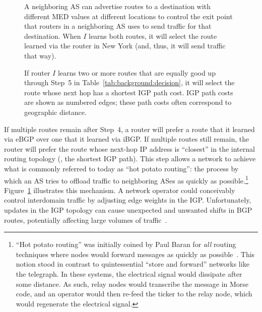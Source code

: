\begin{figure}
\begin{minipage}{0.48\linewidth}
\centering{}
\caption[The use of the MED attribute to control inbound traffic]{A
neighboring AS can advertise routes to a destination with 
different MED values at different locations to control the exit point
that routers in a neighboring AS uses to send traffic for that
destination.  When $I$ learns both routes, it will select the route
learned via the router in New York (and, thus, it will send traffic that
way).}
\label{fig:rw_med}
\end{minipage}
\hfill
\begin{minipage}{0.48\linewidth}
\centering{}
\caption[How the IGP implements ``hot potato'' routing]{If router $I$ learns two or more routes that are equally good
up through Step~5 in Table~\ref{tab:background:decision}, it will select the route
whose next hop has a shortest IGP path cost.  IGP path costs are shown as
numbered edges; these path costs often correspond to geographic distance.}
\label{fig:background:hotpotato}
\end{minipage}
\end{figure}



If multiple routes remain after Step~4, a router will prefer a route
that it learned via eBGP over one that it learned via iBGP.  If multiple
routes still remain, the router will prefer the route whose next-hop IP
address is ``closest'' in the internal routing topology (\ie, the
shortest IGP path).  This step allows a network to achieve what is
commonly referred to today as ``hot potato routing'': the process by
which an AS tries to offload traffic to neighboring ASes as quickly as
possible.\footnote{``Hot potato routing'' was initially coined by Paul
Baran for {\em all} routing techniques where nodes would forward
messages as quickly as possible~\cite{hafner1996}.  This notion stood in
contrast to quintessential ``store and forward'' networks like the
telegraph.  In these systems, the electrical signal would dissipate
after some distance.  As such, relay nodes would transcribe the message
in Morse code, and an operator would then re-feed the ticker to
the relay node, which would regenerate the electrical signal.}  
Figure~\ref{fig:background:hotpotato} illustrates this mechanism.  A network
operator could conceivably control interdomain traffic by adjusting edge
weights in the IGP. Unfortunately, updates in the IGP topology
can cause unexpected and unwanted shifts in BGP routes, potentially
affecting large volumes of traffic~\cite{teixeira2004b}.

